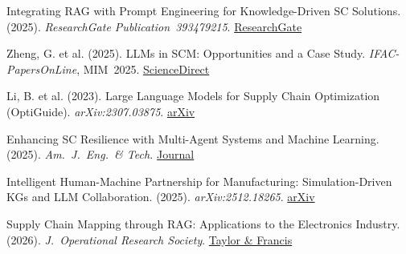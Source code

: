 \documentclass[11pt,a4paper]{article}
\begin{document}
\begin{enumerate}[leftmargin=2em, itemsep=0.4em, label={[\arabic*]}]
    \item Integrating RAG with Prompt Engineering for Knowledge-Driven SC Solutions. (2025). \textit{ResearchGate Publication~393479215}. \href{https://www.researchgate.net/publication/393479215}{ResearchGate}

    \item Zheng, G. et al. (2025). LLMs in SCM: Opportunities and a Case Study. \textit{IFAC-PapersOnLine}, MIM~2025. \href{https://www.sciencedirect.com/science/article/pii/S2405896325012595}{ScienceDirect}

    \item Li, B. et al. (2023). Large Language Models for Supply Chain Optimization (OptiGuide). \textit{arXiv:2307.03875}. \href{https://arxiv.org/abs/2307.03875}{arXiv}

    \item Enhancing SC Resilience with Multi-Agent Systems and Machine Learning. (2025). \textit{Am.\ J.\ Eng.\ \& Tech.} \href{https://theamericanjournals.com/index.php/tajet/article/view/5919}{Journal}

    \item Intelligent Human-Machine Partnership for Manufacturing: Simulation-Driven KGs and LLM Collaboration. (2025). \textit{arXiv:2512.18265}. \href{https://arxiv.org/abs/2512.18265}{arXiv}

    \item Supply Chain Mapping through RAG: Applications to the Electronics Industry. (2026). \textit{J.\ Operational Research Society}. \href{https://www.tandfonline.com/doi/full/10.1080/01605682.2025.2608868}{Taylor \& Francis}
\end{enumerate}
\renewcommand{\arraystretch}{1.0}
\end{document}
